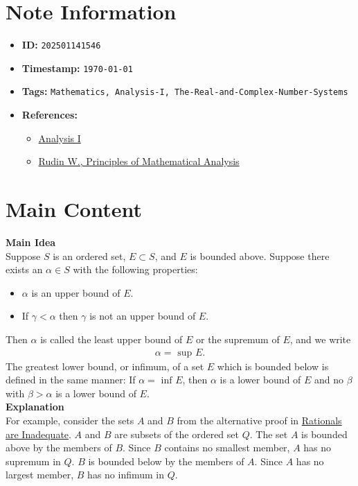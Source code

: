 \clearpage
{}
\label{202501141546}
\renewcommand{\notetitle}{Supremum and Infimum}

\section*{Note Information}
\begin{itemize}
  \item \textbf{ID:} \texttt{202501141546}
  \item \textbf{Timestamp:} \texttt{\today \ \currenttime}
  \item \textbf{Tags:} \texttt{Mathematics, Analysis-I, The-Real-and-Complex-Number-Systems}
  \item \textbf{References:}
    \begin{itemize}
      \item \href{https://ocw.mit.edu/courses/18-100b-analysis-i-fall-2010/}{Analysis I}
      \item \href{/home/garrett/Personal/References/Mathematics/Analysis-I/Rudin.pdf}{Rudin W., Principles of Mathematical Analysis}
    \end{itemize}
\end{itemize}


\section*{Main Content}
\textbf{Main Idea}\\
Suppose $S$ is an ordered set, $E \subset S$, and $E$ is bounded above. Suppose there exists an $\alpha \in S$ with the following properties:
\begin{itemize}
  \item $\alpha$ is an upper bound of $E$.
  \item If $\gamma < \alpha$ then $\gamma$ is not an upper bound of $E$.  
\end{itemize}
Then $\alpha$ is called the least upper bound of $E$ or the supremum of $E$, and we write
\begin{align*}
  \alpha = \text{ sup } E.
\end{align*}
The greatest lower bound, or infimum, of a set $E$ which is bounded below is defined in the same manner: If $\alpha = \text{ inf } E$, then $\alpha$ is a lower bound of $E$ and no $\beta$ with $\beta > \alpha$ is a lower bound of $E$.\\

\textbf{Explanation}\\
For example, consider the sets $A$ and $B$ from the alternative proof in \hyperref[202501132004]{Rationals are Inadequate}. $A$ and $B$ are subsets of the ordered set $Q$. The set $A$ is bounded above by the members of $B$. Since $B$ contains no smallest member, $A$ has no supremum in $Q$. $B$ is bounded below by the members of $A$. Since $A$ has no largest member, $B$ has no infimum in $Q$.\\


